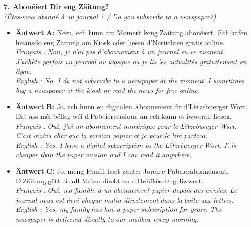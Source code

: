 \noindent\textbf{7. Abonéiert Dir eng Zäitung?}\\
\textit{(Êtes-vous abonné à un journal ? / Do you subscribe to a newspaper?)}
\begin{itemize}
    \item \textbf{Äntwert A:} Neen, ech hunn am Moment keng Zäitung abonéiert. Ech kafen heiansdo eng Zäitung am Kiosk oder liesen d'Noriichten gratis online.\\
    \textit{Français : Non, je n'ai pas d'abonnement à un journal en ce moment. J'achète parfois un journal au kiosque ou je lis les actualités gratuitement en ligne.}\\
    \textit{English : No, I do not subscribe to a newspaper at the moment. I sometimes buy a newspaper at the kiosk or read the news for free online.}
    \item \textbf{Äntwert B:} Jo, ech hunn en digitalen Abonnement fir d'Lëtzebuerger Wort. Dat ass méi bëlleg wéi d'Pabeierversioun an ech kann et iwwerall liesen.\\
    \textit{Français : Oui, j'ai un abonnement numérique pour le Lëtzebuerger Wort. C'est moins cher que la version papier et je peux le lire partout.}\\
    \textit{English : Yes, I have a digital subscription to the Lëtzebuerger Wort. It is cheaper than the paper version and I can read it anywhere.}
    \item \textbf{Äntwert C:} Jo, meng Famill huet zanter Joren e Pabeierabonnement. D'Zäitung gëtt eis all Moien direkt an d'Bréifkëscht geliwwert.\\
    \textit{Français : Oui, ma famille a un abonnement papier depuis des années. Le journal nous est livré chaque matin directement dans la boîte aux lettres.}\\
    \textit{English : Yes, my family has had a paper subscription for years. The newspaper is delivered directly to our mailbox every morning.}
\end{itemize}
\vspace{0.5em}

